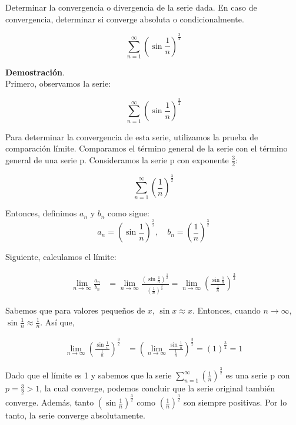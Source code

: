 \documentclass{article}
\begin{document}
    Determinar la convergencia o divergencia de la serie dada. En caso de convergencia, determinar si converge absoluta o condicionalmente.

    $$
    \sum_{n=1}^{\infty}\left(\sin \frac{1}{n}\right)^{\frac{3}{2}}
    $$

    \textbf{Demostración}.\\

    Primero, observamos la serie:

    $$
    \sum_{n=1}^{\infty}\left(\sin \frac{1}{n}\right)^{\frac{3}{2}}
    $$

    Para determinar la convergencia de esta serie, utilizamos la prueba de comparación límite. Comparamos el término general de la serie con el término general de una serie p. Consideramos la serie p con exponente $\frac{3}{2}$:

    $$
    \sum_{n=1}^{\infty} \left( \frac{1}{n} \right)^{\frac{3}{2}}
    $$

    Entonces, definimos \(a_n\) y \(b_n\) como sigue:
    $$
    a_n = \left(\sin \frac{1}{n}\right)^{\frac{3}{2}}, \quad b_n = \left(\frac{1}{n}\right)^{\frac{3}{2}}
    $$

    Siguiente, calculamos el límite:

    \begin{align*}
    \lim _{n \rightarrow \infty} \frac{a_n}{b_n} &= \lim _{n \rightarrow \infty} \frac{\left(\sin \frac{1}{n}\right)^{\frac{3}{2}}}{\left(\frac{1}{n}\right)^{\frac{3}{2}}}
    = \lim _{n \rightarrow \infty}\left(\frac{\sin \frac{1}{n}}{\frac{1}{n}}\right)^{\frac{3}{2}}
    \end{align*}

    Sabemos que para valores pequeños de \(x\), \(\sin x \approx x\). Entonces, cuando \(n \to \infty\), \(\sin \frac{1}{n} \approx \frac{1}{n}\). Así que,

    \begin{align*}
    \lim _{n \rightarrow \infty}\left(\frac{\sin \frac{1}{n}}{\frac{1}{n}}\right)^{\frac{3}{2}} &= \left(\lim _{n \rightarrow \infty} \frac{\sin \frac{1}{n}}{\frac{1}{n}}\right)^{\frac{3}{2}} = (1)^{\frac{3}{2}} = 1
    \end{align*}

    Dado que el límite es 1 y sabemos que la serie \( \sum_{n=1}^{\infty} \left( \frac{1}{n} \right)^{\frac{3}{2}} \) es una serie p con \(p = \frac{3}{2} > 1\), la cual converge, podemos concluir que la serie original también converge. Además, tanto \(\left(\sin \frac{1}{n}\right)^{\frac{3}{2}}\) como \(\left(\frac{1}{n}\right)^{\frac{3}{2}}\) son siempre positivas. Por lo tanto, la serie converge absolutamente.
\end{document}
